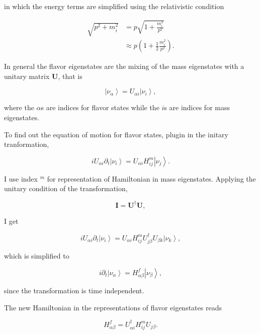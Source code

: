 \documentclass{tufte-handout}
\newcommand{\ket}[1]{\left| #1\right\rangle}
\begin{document}
in which the energy terms are simplified using the relativistic condition

\begin{align}
\sqrt{p^2+m_i^2} & = p\sqrt{1 + \frac{m_i^2}{p^2}} \\
&\approx  p(1 + \frac{1}{2} \frac{m_i^2}{p^2}).
\end{align}


In general the flavor eigenstates are the mixing of the mass eigenstates with a unitary matrix $\mathbf U$, that is

\begin{equation}
\ket{\nu_{\alpha}} =  U_{\alpha i} \ket{\nu_i},
\end{equation}

where the $\alpha$s are indices for flavor states while the $i$s are indices for mass eigenstates.

To find out the equation of motion for flavor states, plugin in the initary tranformation,

\begin{equation}
i  U_{\alpha i} \partial_t \ket{\nu_i} =  U_{\alpha i}  H^m_{ij} \ket{\nu_j}.
\end{equation}

I use index ${}^m$ for representation of Hamiltonian in mass eigenstates. Applying the unitary condition of the transformation,

\begin{equation}
\mathbf I = \mathbf {U^\dagger} \mathbf U,
\end{equation}

I get

\begin{equation}
i U_{\alpha i} \partial_t \ket{\nu_i} =  U_{\alpha i} H^m_{i j}  {U^\dagger_{j\beta}}  U_{\beta k} \ket{\nu_k},
\end{equation}

which is simplified to

\begin{equation}
i \partial_t \ket{\nu_\alpha} = H^f_{\alpha \beta} \ket{\nu_{\beta}},
\end{equation}

since the transformation is time independent.

The new Hamiltonian in the representations of flavor eigenstates reads

\begin{equation}
H^f_{\alpha\beta}  = U^\dagger_{\alpha i} H^m_{ij} U_{j\beta}.
\end{equation}
\end{document}
